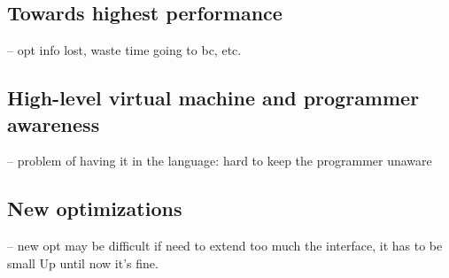\documentclass[a4paper,12pt,twoside]{../includes/ThesisStyle}
\begin{document}
\subsection{Towards highest performance}
-- opt info lost, waste time going to bc, etc.

\subsection{High-level virtual machine and programmer awareness}
-- problem of having it in the language: hard to keep the programmer unaware

\subsection{New optimizations}
-- new opt may be difficult if need to extend too much the interface, it has to be small
Up until now it's fine.

\ifx\wholebook\relax\else
    
\end{document}
